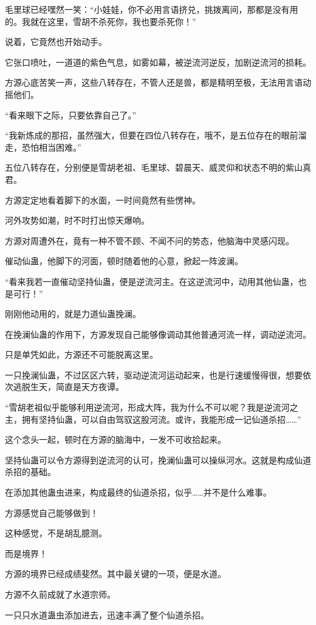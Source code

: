 \begin{this_body}
毛里球已经嘿然一笑：“小娃娃，你不必用言语挤兑，挑拨离间，那都是没有用的。我就在这里，雪胡不杀死你，我也要杀死你！”

说着，它竟然也开始动手。

它张口喷吐，一道道的紫色气息，如雾如幕，被逆流河逆反，加剧逆流河的损耗。

方源心底苦笑一声，这些八转存在，不管人还是兽，都是精明至极，无法用言语动摇他们。

“看来眼下之际，只要依靠自己了。”

“我新炼成的那招，虽然强大，但要在四位八转存在，哦不，是五位存在的眼前溜走，恐怕相当困难。”

五位八转存在，分别便是雪胡老祖、毛里球、碧晨天、威灵仰和状态不明的紫山真君。

方源定定地看着脚下的水面，一时间竟然有些愣神。

河外攻势如潮，时不时打出惊天爆响。

方源对周遭外在，竟有一种不管不顾、不闻不问的势态，他脑海中灵感闪现。

催动仙蛊，他脚下的河面，顿时随着他的心意，掀起一阵波澜。

“看来我若一直催动坚持仙蛊，便是逆流河主。在这逆流河中，动用其他仙蛊，也是可行！”

刚刚他动用的，就是力道仙蛊挽澜。

在挽澜仙蛊的作用下，方源发现自己能够像调动其他普通河流一样，调动逆流河。

只是单凭如此，方源还不可能脱离这里。

一只挽澜仙蛊，不过区区六转，驱动逆流河运动起来，也是行速缓慢得很，想要依次逃脱生天，简直是天方夜谭。

“雪胡老祖似乎能够利用逆流河，形成大阵，我为什么不可以呢？我是逆流河之主，拥有坚持仙蛊，可以自由驾驭这股河流。或许，我能形成一记仙道杀招……”

这个念头一起，顿时在方源的脑海中，一发不可收拾起来。

坚持仙蛊可以令方源得到逆流河的认可，挽澜仙蛊可以操纵河水。这就是构成仙道杀招的基础。

在添加其他蛊虫进来，构成最终的仙道杀招，似乎……并不是什么难事。

方源感觉自己能够做到！

这种感觉，不是胡乱臆测。

而是境界！

方源的境界已经成绩斐然。其中最关键的一项，便是水道。

方源不久前成就了水道宗师。

一只只水道蛊虫添加进去，迅速丰满了整个仙道杀招。


\end{this_body}
